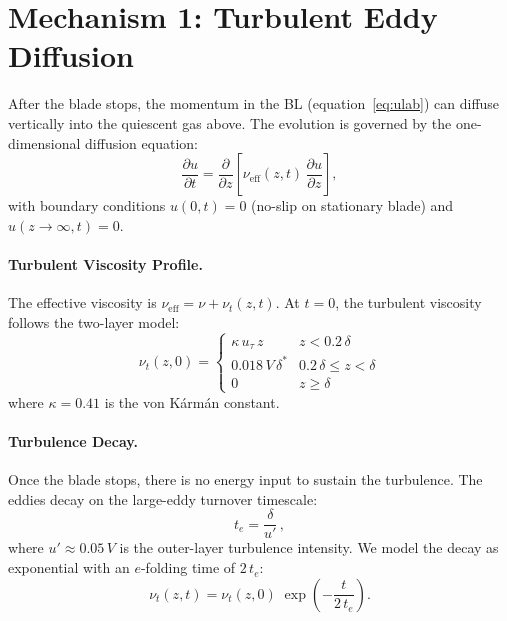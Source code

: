 \documentclass[11pt,a4paper]{article}
\begin{document}
\section{Mechanism 1: Turbulent Eddy Diffusion}
\label{sec:eddies}

After the blade stops, the momentum in the BL (equation~\ref{eq:ulab})
can diffuse vertically into the quiescent gas above. The evolution is
governed by the one-dimensional diffusion equation:
\begin{equation}
  \frac{\partial u}{\partial t}
  = \frac{\partial}{\partial z}
    \left[\nu_\mathrm{eff}(z,t)\,\frac{\partial u}{\partial z}\right],
  \label{eq:diffusion}
\end{equation}
with boundary conditions $u(0,t) = 0$ (no-slip on stationary blade) and
$u(z \to \infty, t) = 0$.

\paragraph{Turbulent Viscosity Profile.}
The effective viscosity is $\nu_\mathrm{eff} = \nu + \nu_t(z,t)$.
At $t = 0$, the turbulent viscosity follows the two-layer model:
\begin{equation}
  \nu_t(z, 0) =
  \begin{cases}
    \kappa\, u_\tau\, z & z < 0.2\,\delta \\
    0.018\, V\, \delta^* & 0.2\,\delta \le z < \delta \\
    0 & z \ge \delta
  \end{cases}
  \label{eq:nut_profile}
\end{equation}
where $\kappa = 0.41$ is the von K\'arm\'an constant.

\paragraph{Turbulence Decay.}
Once the blade stops, there is no energy input to sustain the
turbulence. The eddies decay on the large-eddy turnover timescale:
\begin{equation}
  t_e = \frac{\delta}{u'}\,,
  \label{eq:teddy}
\end{equation}
where $u' \approx 0.05\,V$ is the outer-layer turbulence intensity.
We model the decay as exponential with an $e$-folding time of $2\,t_e$:
\begin{equation}
  \nu_t(z,t) = \nu_t(z,0)\;\exp\!\left(-\frac{t}{2\,t_e}\right).
  \label{eq:nut_decay}
\end{equation}
\end{document}

